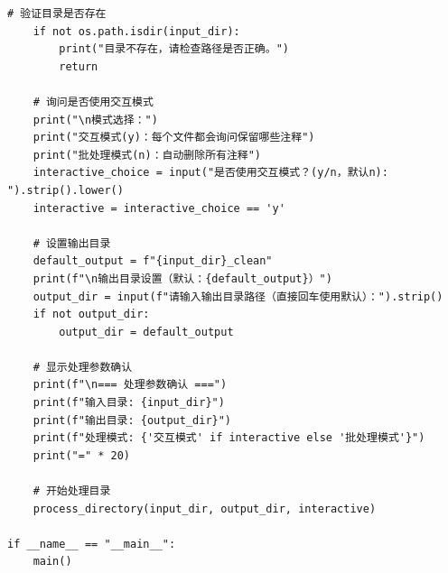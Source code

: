 \begin{lstlisting}[style=pythonstyle, title={递归删除整个文件夹中注释.py}]
    # 验证目录是否存在
    if not os.path.isdir(input_dir):
        print("目录不存在，请检查路径是否正确。")
        return
    
    # 询问是否使用交互模式
    print("\n模式选择：")
    print("交互模式(y)：每个文件都会询问保留哪些注释")
    print("批处理模式(n)：自动删除所有注释")
    interactive_choice = input("是否使用交互模式？(y/n，默认n): ").strip().lower()
    interactive = interactive_choice == 'y'
    
    # 设置输出目录
    default_output = f"{input_dir}_clean"
    print(f"\n输出目录设置（默认：{default_output}）")
    output_dir = input(f"请输入输出目录路径（直接回车使用默认）：").strip()
    if not output_dir:
        output_dir = default_output
    
    # 显示处理参数确认
    print(f"\n=== 处理参数确认 ===")
    print(f"输入目录: {input_dir}")
    print(f"输出目录: {output_dir}")
    print(f"处理模式: {'交互模式' if interactive else '批处理模式'}")
    print("=" * 20)
    
    # 开始处理目录
    process_directory(input_dir, output_dir, interactive)

if __name__ == "__main__":
    main()
\end{lstlisting}
